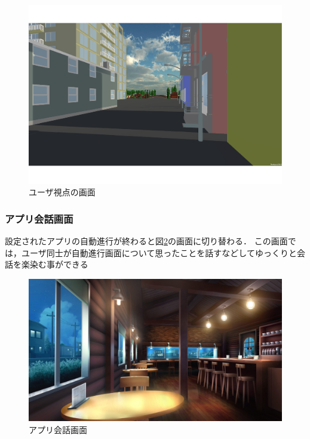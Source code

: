\documentclass[12pt,a4j,titlepage]{ltjsarticle}
\begin{document}
\begin{figure}[h]
\begin{center}
\includegraphics[keepaspectratio, scale=0.5]{yu-za-gamen.pdf}
\end{center}
 \caption{ユーザ視点の画面}
 \label{fig:yu-za-}
\end{figure}
\clearpage

\subsubsection{アプリ会話画面}
設定されたアプリの自動進行が終わると図\ref{fig:kissa}の画面に切り替わる．
この画面では，ユーザ同士が自動進行画面について思ったことを話すなどしてゆっくりと会話を楽染む事ができる

\begin{figure}[h]
\begin{center}
\includegraphics[keepaspectratio, scale=0.5]{kissatenn.pdf}
\end{center}
 \caption{アプリ会話画面}
 \label{fig:kissa}
\end{figure}
\end{document}

